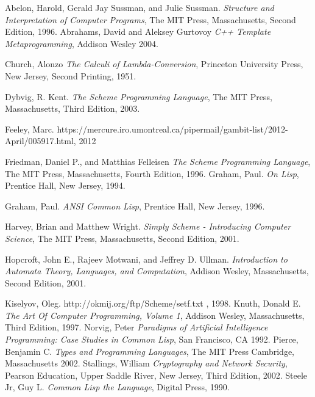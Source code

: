  
\begin{thebibliography}{9}

  Abelon, Harold, Gerald Jay Sussman, and Julie Sussman.
  \emph{Structure and Interpretation of Computer Programs},
  The MIT Press, Massachusetts,
  Second Edition,
  1996.
  Abrahams, David and Aleksey Gurtovoy
  \emph{C++ Template Metaprogramming},
  Addison Wesley
  2004.

  Church, Alonzo
  \emph{The Calculi of Lambda-Conversion},
  Princeton University Press, New Jersey,
  Second Printing,
  1951.

  Dybvig, R. Kent.
  \emph{The Scheme Programming Language},
  The MIT Press, Massachusetts,
  Third Edition,
  2003.

  Feeley, Marc. https://mercure.iro.umontreal.ca/pipermail/gambit-list/2012-April/005917.html, 2012

  Friedman, Daniel P., and Matthias Felleisen
  \emph{The Scheme Programming Language},
  The MIT Press, Massachusetts,
  Fourth Edition,
  1996.
  Graham, Paul.
  \emph{On Lisp},
  Prentice Hall, New Jersey,
  1994.

  Graham, Paul.
  \emph{ANSI Common Lisp},
  Prentice Hall, New Jersey,
  1996.

  Harvey, Brian and Matthew Wright.
  \emph{Simply Scheme - Introducing Computer Science},
  The MIT Press, Massachusetts,
  Second Edition,
  2001.

  Hopcroft, John E., Rajeev Motwani, and Jeffrey D. Ullman.
  \emph{Introduction to Automata Theory, Languages, and Computation},
  Addison Wesley, Massachusetts,
  Second Edition,
  2001.

  Kiselyov, Oleg. http://okmij.org/ftp/Scheme/setf.txt , 1998.
  Knuth, Donald E.
  \emph{The Art Of Computer Programming, Volume 1},
  Addison Wesley, Massachusetts,
  Third Edition,
  1997.
  Norvig, Peter
  \emph{Paradigms of Artificial Intelligence Programming: Case Studies in Common Lisp},
  San Francisco, CA
  1992.
  Pierce, Benjamin C.
  \emph{Types and Programming Languages},
  The MIT Press
  Cambridge, Massachusetts
  2002.
  Stallings, William
  \emph{Cryptography and Network Security},
  Pearson Education, Upper Saddle River, New Jersey,
  Third Edition,
  2002.
  Steele Jr, Guy L.
  \emph{Common Lisp the Language},
  Digital Press,
  1990.




\end{thebibliography}
 \printindex

